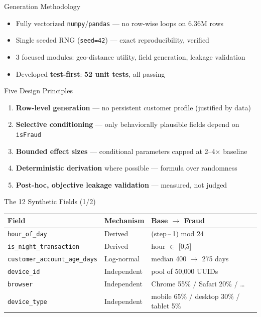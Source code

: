 \documentclass[aspectratio=169]{beamer}
\begin{document}
\begin{frame}{Generation Methodology}
\begin{itemize}
    \item Fully vectorized \texttt{numpy}/\texttt{pandas} --- no row-wise loops on 6.36M rows
    \item Single seeded RNG (\texttt{seed=42}) --- exact reproducibility, verified
    \item 3 focused modules: geo-distance utility, field generation, leakage validation
    \item Developed \textbf{test-first}: \textbf{52 unit tests}, all passing
\end{itemize}
\end{frame}

\begin{frame}{Five Design Principles}
\begin{enumerate}
    \item \textbf{Row-level generation} --- no persistent customer profile (justified by data)
    \item \textbf{Selective conditioning} --- only behaviorally plausible fields depend on \texttt{isFraud}
    \item \textbf{Bounded effect sizes} --- conditional parameters capped at 2--4\(\times\) baseline
    \item \textbf{Deterministic derivation} where possible --- formula over randomness
    \item \textbf{Post-hoc, objective leakage validation} --- measured, not judged
\end{enumerate}
\end{frame}

\begin{frame}{The 12 Synthetic Fields (1/2)}
\centering\scriptsize
\begin{tabular}{@{}lll@{}}
\toprule
\textbf{Field} & \textbf{Mechanism} & \textbf{Base \(\rightarrow\) Fraud} \\
\midrule
\texttt{hour\_of\_day} & Derived & (step\,--\,1) mod 24 \\
\texttt{is\_night\_transaction} & Derived & hour \(\in\) [0,5] \\
\texttt{customer\_account\_age\_days} & Log-normal & median 400 \(\rightarrow\) 275 days \\
\texttt{device\_id} & Independent & pool of 50,000 UUIDs \\
\texttt{browser} & Independent & Chrome 55\% / Safari 20\% / \dots \\
\texttt{device\_type} & Independent & mobile 65\% / desktop 30\% / tablet 5\% \\
\bottomrule
\end{tabular}
\end{frame}
\end{document}
